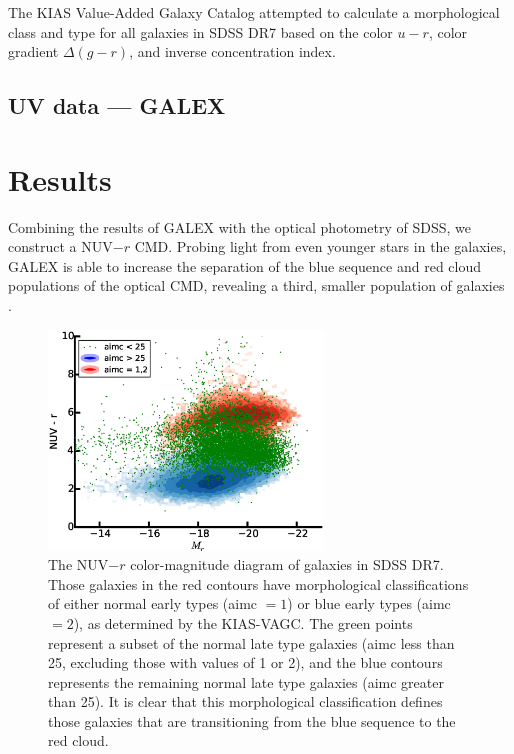The KIAS Value-Added Galaxy Catalog 
\citep[KIAS-VAGC]{Choi10} attempted to calculate a morphological class and type 
for all galaxies in SDSS DR7 based on the color $u-r$, color gradient 
$\Delta (g-r)$, and inverse concentration index.  

\subsection{UV data --- GALEX}
\citep{Martin05}




\section[Results]{Results}

Combining the results of GALEX with the optical photometry of SDSS, we construct 
a NUV$-r$ CMD.  Probing light from even younger stars in the galaxies, GALEX is 
able to increase the separation of the blue sequence and red cloud populations 
of the optical CMD, revealing a third, smaller population of galaxies 
\citep{Wyder07}.

\begin{figure}
    \includegraphics[width=0.65\textwidth]{Images/GV/NUVr_CMD_3pop_scatter}
    \caption[NUV-$r$ color-magnitude diagram of SDSS galaxies]{The NUV$-r$ 
    color-magnitude diagram of galaxies in SDSS DR7.  Those galaxies in the red 
    contours have morphological classifications of either normal early types 
    (aimc $=1$) or blue early types (aimc $=2$), as determined by the KIAS-VAGC.  
    The green points represent a subset of the normal late type galaxies (aimc 
    less than 25, excluding those with values of 1 or 2), and the blue contours 
    represents the remaining normal late type galaxies (aimc greater than 25).  
    It is clear that this morphological classification defines those galaxies 
    that are transitioning from the blue sequence to the red cloud.}
    \label{fig:NUVr_CMD}
\end{figure}

